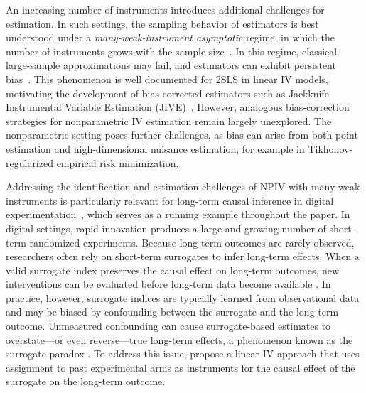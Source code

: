 \documentclass[11pt]{article}
\theoremstyle{plain}
\theoremstyle{definition}
\theoremstyle{remark}
\theoremstyle{definition}
\begin{document}
An increasing number of instruments introduces additional challenges for estimation.  In such settings, the sampling behavior of estimators is best understood under a \emph{many-weak-instrument asymptotic} regime, in which the number of instruments grows with the sample size~\citep{staiger1994instrumental, stock2005asymptotic, bekker2005instrumental, chao2005consistent}.  
In this regime, classical large-sample approximations may fail, and estimators can exhibit persistent bias~\citep{nelson1988distribution, staiger1994instrumental, angrist1999jackknife, stock2002survey, stock2005asymptotic, hansen2008estimation, angrist2009mostly, kolesar2015identification, peysakhovich2018learning}.  
This phenomenon is well documented for 2SLS in linear IV models, motivating the development of bias-corrected estimators such as Jackknife Instrumental Variable Estimation (JIVE)~\citep{angrist1999jackknife, hansen2014instrumental}.  
However, analogous bias-correction strategies for nonparametric IV estimation remain largely unexplored. The nonparametric setting poses further challenges, as bias can arise from both point estimation and high-dimensional nuisance estimation, for example in Tikhonov-regularized empirical risk minimization.


 



Addressing the identification and estimation challenges of NPIV with many weak instruments is particularly relevant for long-term causal inference in digital experimentation~\citep{peysakhovich2018learning, athey2019surrogate, duan2021online, zhang2023evaluating, bibaut2024nonparametric}, which serves as a running example throughout the paper.  
In digital settings, rapid innovation produces a large and growing number of short-term randomized experiments. Because long-term outcomes are rarely observed, researchers often rely on short-term surrogates to infer long-term effects.  
When a valid surrogate index preserves the causal effect on long-term outcomes, new interventions can be evaluated before long-term data become available \citep{athey2019surrogate}.  
In practice, however, surrogate indices are typically learned from observational data and may be biased by confounding between the surrogate and the long-term outcome.  
Unmeasured confounding can cause surrogate-based estimates to overstate---or even reverse---true long-term effects, a phenomenon known as the surrogate paradox \citep{elliott2015surrogacy}.  
To address this issue, \citet{peysakhovich2018learning} propose a linear IV approach that uses assignment to past experimental arms as instruments for the causal effect of the surrogate on the long-term outcome.
\end{document}
